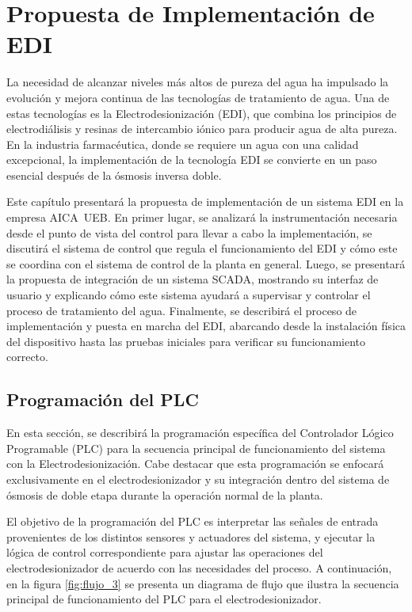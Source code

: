 \chapter{Propuesta de Implementación de EDI}
\label{cap:propuesta_implementacion}
\vspace{-2cm} 
La necesidad de alcanzar niveles más altos de pureza del agua ha impulsado
la evolución y mejora continua de las tecnologías de tratamiento de agua.
Una de estas tecnologías es la Electrodesionización (EDI), que combina
los principios de electrodiálisis y resinas de intercambio iónico para
producir agua de alta pureza. En la industria farmacéutica, donde se
requiere un agua con una calidad excepcional, la implementación de la
tecnología EDI se convierte en un paso esencial después de la ósmosis inversa doble.

Este capítulo presentará la propuesta de implementación de un sistema
EDI en la empresa AICA UEB. En primer lugar, se analizará la instrumentación
necesaria desde el punto de vista del control para llevar a cabo la implementación, se discutirá el sistema de
control que regula el funcionamiento del EDI y cómo este se coordina
con el sistema de control de la planta en general.
Luego, se presentará la propuesta de integración de un sistema SCADA,
mostrando su interfaz de usuario y explicando cómo este sistema
ayudará a supervisar y controlar el proceso de tratamiento del agua.
Finalmente, se describirá el proceso de implementación y puesta en marcha del
EDI, abarcando desde la instalación física del dispositivo hasta las pruebas
iniciales para verificar su funcionamiento correcto.




\section{Programación del PLC}
\label{sec:sistema_control}
En esta sección, se describirá la programación específica del Controlador
Lógico Programable (PLC) para la secuencia principal de funcionamiento del
sistema con la Electrodesionización. Cabe destacar que esta programación
se enfocará exclusivamente en el electrodesionizador y su integración dentro
del sistema de ósmosis de doble etapa durante la operación normal de la planta.

El objetivo de la programación del PLC es interpretar las señales de entrada
provenientes de los distintos sensores y actuadores del sistema, y ejecutar
la lógica de control correspondiente para ajustar las operaciones del
electrodesionizador de acuerdo con las necesidades del proceso.
A continuación, en la figura \ref{fig:flujo_3} se presenta un diagrama de flujo que ilustra la
secuencia principal de funcionamiento del PLC para el electrodesionizador.

